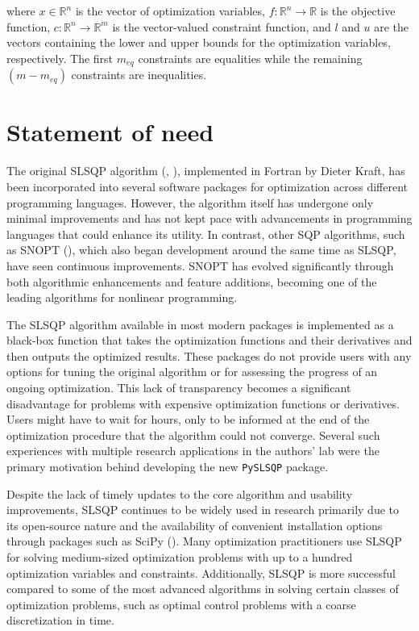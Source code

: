 \documentclass[
]{article}
\begin{document}
where \(x \in \mathbb{R}^n\) is the vector of optimization variables,
\(f: \mathbb{R}^n \to \mathbb{R}\) is the objective function,
\(c: \mathbb{R}^n \to \mathbb{R}^m\) is the vector-valued constraint
function, and \(l\) and \(u\) are the vectors containing the lower and
upper bounds for the optimization variables, respectively. The first
\(m_{eq}\) constraints are equalities while the remaining
\((m - m_{eq})\) constraints are inequalities.

\section{Statement of need}\label{statement-of-need}

The original SLSQP algorithm (, ), implemented in Fortran
by Dieter Kraft, has been incorporated into several software packages
for optimization across different programming languages. However, the
algorithm itself has undergone only minimal improvements and has not
kept pace with advancements in programming languages that could enhance
its utility. In contrast, other SQP algorithms, such as SNOPT
(), which also began
development around the same time as SLSQP, have seen continuous
improvements. SNOPT has evolved significantly through both algorithmic
enhancements and feature additions, becoming one of the leading
algorithms for nonlinear programming.

The SLSQP algorithm available in most modern packages is implemented as
a black-box function that takes the optimization functions and their
derivatives and then outputs the optimized results. These packages do
not provide users with any options for tuning the original algorithm or
for assessing the progress of an ongoing optimization. This lack of
transparency becomes a significant disadvantage for problems with
expensive optimization functions or derivatives. Users might have to
wait for hours, only to be informed at the end of the optimization
procedure that the algorithm could not converge. Several such
experiences with multiple research applications in the authors' lab were
the primary motivation behind developing the new \texttt{PySLSQP}
package.

Despite the lack of timely updates to the core algorithm and usability
improvements, SLSQP continues to be widely used in research primarily
due to its open-source nature and the availability of convenient
installation options through packages such as SciPy
(). Many
optimization practitioners use SLSQP for solving medium-sized
optimization problems with up to a hundred optimization variables and
constraints. Additionally, SLSQP is more successful compared to some of
the most advanced algorithms in solving certain classes of optimization
problems, such as optimal control problems with a coarse discretization
in time.
\end{document}

